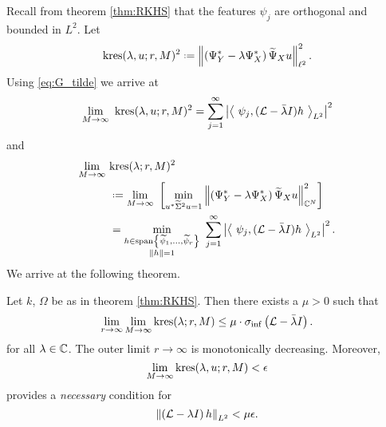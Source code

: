 Recall from theorem \ref{thm:RKHS} that the features $\psi_j$ are orthogonal and bounded 
in $L^2$. Let 
\begin{equation}
    \kres (\lambda, u; r, M)^2 \defeq 
    \left\| \left( \YY^* - \lambda \YX^* \right) \tYX u \right\|_{\ell^2}^2 . 
\end{equation}
Using \ref{eq:G_tilde} we arrive at
\begin{equation}
    \lim_{M \to \infty}\ \kres (\lambda, u; r, M)^2 = 
    \sum_{j=1}^{\infty} \left| \left\langle\ 
    \psi_j, (\scrL - \bar{\lambda} I) h \ \right\rangle_{L^2} \right|^2 
\end{equation}
and 
\begin{align}
    \lim_{M \to \infty}\ &\kres (\lambda; r, M)^2 \\
    &\defeq \lim_{M \to \infty}\ \left[ \min_{u^* \widetilde{ \Sigma }^2 u = 1} 
    \left\| \left( \YY^* - \lambda \YX^* \right) \tYX u \right\|_{\bbC^N}^2 
    \right]\label{eq:new_res_hat} \\
    &= \min_{\substack{
        h \in \spn \left\{ \widetilde{ \psi }_1, \ldots, \widetilde{ \psi }_r \right\} \\ 
        \left\| h \right\| = 1
    }}\ \sum_{j=1}^{\infty} \left| \left\langle\ 
        \psi_j, (\scrL - \bar{\lambda} I) h 
    \ \right\rangle_{L^2} \right|^2 . 
\end{align}
We arrive at the following theorem. 

\begin{theorem}
    Let $k$, $\Omega$ be as in theorem \ref{thm:RKHS}. Then there exists a $\mu > 0$ such 
    that
    \begin{equation}
        \lim_{r \to \infty} \lim_{M \to \infty} \text{kres} (\lambda; r, M) \leq 
        \mu \cdot \sigma_{\inf} \left( \mathcal{L} - \bar{\lambda} I \right) . 
    \end{equation}
    for all $\lambda \in \mathbb{C}$. The outer limit $r \to \infty$ is monotonically decreasing. 
    Moreover, 
    \begin{equation}
        \lim_{M \to \infty} \text{kres} (\lambda, u; r, M) < \epsilon
    \end{equation}
    provides a \emph{necessary} condition for 
    \begin{equation}
        \left\| \left( \mathcal{L} - \lambda I \right) h \right\|_{L^2} < \mu \epsilon . 
    \end{equation}
\end{theorem}

